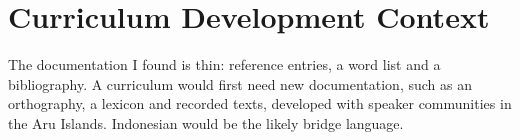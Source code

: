 \documentclass[12pt]{article}
\begin{document}
\section{Curriculum Development Context}
The documentation I found is thin: reference entries, a word list and a bibliography. A curriculum would first need new documentation, such as an orthography, a lexicon and recorded texts, developed with speaker communities in the Aru Islands. Indonesian would be the likely bridge language.
\end{document}
